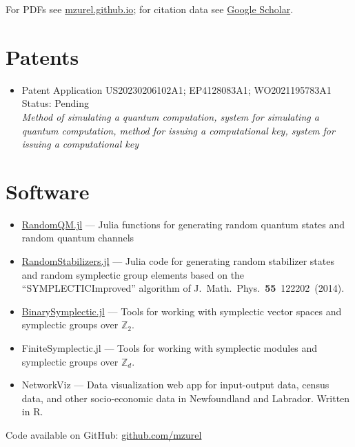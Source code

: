 \documentclass[letterpaper,11pt]{article}
\newcommand{\ConferenceItem}[3]{
	\item{\parbox{0.97\textwidth}{
		{#1}  \hfill {#2}\\
		\emph{#3}
	}}
}
\begin{document}
\nocite{ZurelCohenRaussendorf2023,ZurelRaussendorf2023,RaussendorfFeldmann2022,ZurelHeimendahl2022,OkayRaussendorf2021,Zurel2020,ZurelRaussendorf2020,RaussendorfZurel2020}
\printbibliography[title={Publications \& preprints}]
For PDFs see \href{mzurel.github.io}{mzurel.github.io}; for citation data see \href{https://scholar.google.com/citations?user=qUA_szUAAAAJ&hl=en&oi=ao}{Google Scholar}.


\section*{Patents}
\begin{itemize}[leftmargin=*]
	\ConferenceItem{Patent Application US20230206102A1; EP4128083A1; WO2021195783A1}{Status: Pending}{Method of simulating a quantum computation, system for simulating a quantum computation, method for issuing a computational key, system for issuing a computational key}
\end{itemize}


\section*{Software}
\begin{itemize}[leftmargin=*]
	\item \href{https://github.com/mzurel/RandomQM.jl}{RandomQM.jl} --- Julia functions for generating random quantum states and random quantum channels
	\vspace{-4pt}
	\item \href{https://github.com/mzurel/RandomStabilizers.jl}{RandomStabilizers.jl} --- Julia code for generating random stabilizer states and random symplectic group elements based on the ``SYMPLECTICImproved'' algorithm of J.~Math.~Phys.~\textbf{55}~122202~(2014).
	\vspace{-4pt}
	\item \href{https://github.com/mzurel/BinarySymplectic.jl}{BinarySymplectic.jl} --- Tools for working with symplectic vector spaces and symplectic groups over $\mathbb{Z}_2$.
	\vspace{-4pt}
	\item FiniteSymplectic.jl --- Tools for working with symplectic modules and symplectic groups over $\mathbb{Z}_d$.
	\item NetworkViz --- Data visualization web app for input-output data, census data, and other socio-economic data in Newfoundland and Labrador.  Written in R.
\end{itemize}
Code available on GitHub: \href{https://github.com/mzurel}{github.com/mzurel}
\end{document}
